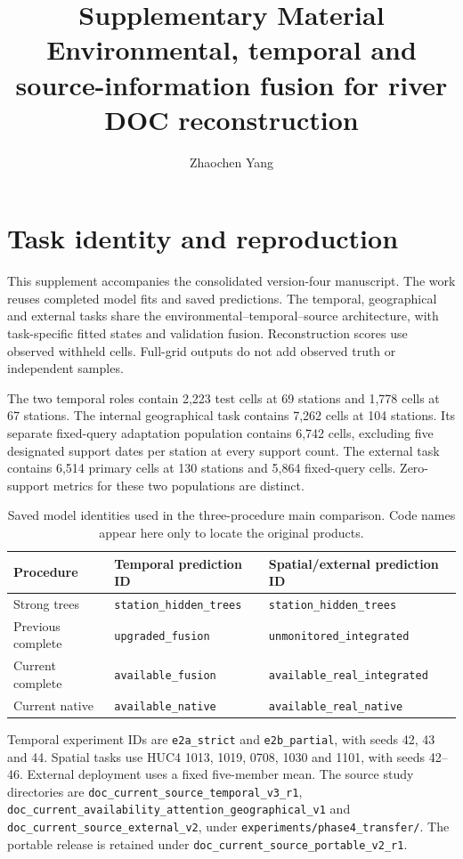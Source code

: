 \documentclass[10pt]{article}
\title{Supplementary Material\\\large Environmental, temporal and source-information fusion for river DOC reconstruction}
\author{Zhaochen Yang}
\date{}
\begin{document}
\maketitle

\section{Task identity and reproduction}
This supplement accompanies the consolidated version-four manuscript. The work reuses completed model fits and saved predictions. The temporal, geographical and external tasks share the environmental--temporal--source architecture, with task-specific fitted states and validation fusion. Reconstruction scores use observed withheld cells. Full-grid outputs do not add observed truth or independent samples.

The two temporal roles contain 2,223 test cells at 69 stations and 1,778 cells at 67 stations. The internal geographical task contains 7,262 cells at 104 stations. Its separate fixed-query adaptation population contains 6,742 cells, excluding five designated support dates per station at every support count. The external task contains 6,514 primary cells at 130 stations and 5,864 fixed-query cells. Zero-support metrics for these two populations are distinct.

\begin{table}[!htbp]\centering\small
\caption{Saved model identities used in the three-procedure main comparison. Code names appear here only to locate the original products.}
\begin{tabular}{L{3.1cm}L{5.4cm}L{5.1cm}}\toprule
Procedure & Temporal prediction ID & Spatial/external prediction ID\\\midrule
Strong trees & \nolinkurl{station_hidden_trees} & \nolinkurl{station_hidden_trees}\\
Previous complete & \nolinkurl{upgraded_fusion} & \nolinkurl{unmonitored_integrated}\\
Current complete & \nolinkurl{available_fusion} & \nolinkurl{available_real_integrated}\\
Current native & \nolinkurl{available_native} & \nolinkurl{available_real_native}\\\bottomrule
\end{tabular}
\end{table}

Temporal experiment IDs are \nolinkurl{e2a_strict} and \nolinkurl{e2b_partial}, with seeds 42, 43 and 44. Spatial tasks use HUC4 1013, 1019, 0708, 1030 and 1101, with seeds 42--46. External deployment uses a fixed five-member mean. The source study directories are \nolinkurl{doc_current_source_temporal_v3_r1}, \nolinkurl{doc_current_availability_attention_geographical_v1} and \nolinkurl{doc_current_source_external_v2}, under \nolinkurl{experiments/phase4_transfer/}. The portable release is retained under \nolinkurl{doc_current_source_portable_v2_r1}.
\end{document}
